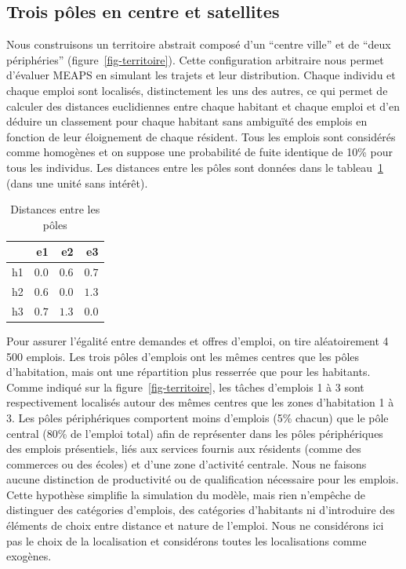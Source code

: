 \documentclass[
  10pt,
  a4paper,
  numbers=noendperiod,
  DIV=9]{scrreprt}
\begin{document}
\hypertarget{sec-3p2s}{%
\subsection{Trois pôles en centre et satellites}\label{sec-3p2s}}

Nous construisons un territoire abstrait composé d'un ``centre ville''
et de ``deux périphéries'' (figure~\ref{fig-territoire}). Cette
configuration arbitraire nous permet d'évaluer MEAPS en simulant les
trajets et leur distribution. Chaque individu et chaque emploi sont
localisés, distinctement les uns des autres, ce qui permet de calculer
des distances euclidiennes entre chaque habitant et chaque emploi et
d'en déduire un classement pour chaque habitant sans ambiguïté des
emplois en fonction de leur éloignement de chaque résident. Tous les
emplois sont considérés comme homogènes et on suppose une probabilité de
fuite identique de 10\% pour tous les individus. Les distances entre les
pôles sont données dans le tableau~\ref{tbl-distances} (dans une unité
sans intérêt).

\hypertarget{tbl-distances}{}
\begin{longtable}{lrrr}
\caption{\label{tbl-distances}Distances entre les pôles }\tabularnewline

\toprule
 & e1 & e2 & e3 \\ 
\midrule
h1 & $0.0$ & $0.6$ & $0.7$ \\ 
h2 & $0.6$ & $0.0$ & $1.3$ \\ 
h3 & $0.7$ & $1.3$ & $0.0$ \\ 
\bottomrule
\end{longtable}

Pour assurer l'égalité entre demandes et offres d'emploi, on tire
aléatoirement 4 500 emplois. Les trois pôles d'emplois ont les mêmes
centres que les pôles d'habitation, mais ont une répartition plus
resserrée que pour les habitants. Comme indiqué sur la
figure~\ref{fig-territoire}, les tâches d'emplois 1 à 3 sont
respectivement localisés autour des mêmes centres que les zones
d'habitation 1 à 3. Les pôles périphériques comportent moins d'emplois
(5\% chacun) que le pôle central (80\% de l'emploi total) afin de
représenter dans les pôles périphériques des emplois présentiels, liés
aux services fournis aux résidents (comme des commerces ou des écoles)
et d'une zone d'activité centrale. Nous ne faisons aucune distinction de
productivité ou de qualification nécessaire pour les emplois. Cette
hypothèse simplifie la simulation du modèle, mais rien n'empêche de
distinguer des catégories d'emplois, des catégories d'habitants ni
d'introduire des éléments de choix entre distance et nature de l'emploi.
Nous ne considérons ici pas le choix de la localisation et considérons
toutes les localisations comme exogènes.
\end{document}
